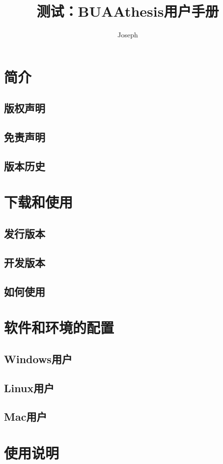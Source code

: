 \documentclass[bachelor,openright]{buaathesis}
\title{测试：BUAAthesis用户手册}
\author{Joseph}
\begin{document}
\maketitle

\frontmatter
\tableofcontents

\mainmatter
\chapter{简介}
	\section{版权声明}
	\section{免责声明}
	\section{版本历史}
	
\chapter{下载和使用}
	\section{发行版本}
	\section{开发版本}
	\section{如何使用}
	
\chapter{软件和环境的配置}
	\section{Windows用户}
	\section{Linux用户}
	\section{Mac用户}
	
\chapter{使用说明}
\end{document}
